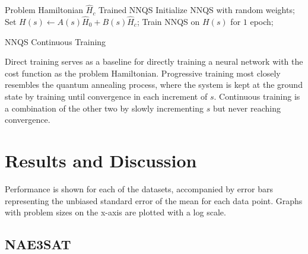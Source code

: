 \begin{algorithm}
    \begin{algorithmic}
    \Require Problem Hamiltonian $\hat{H}_c$
    \Ensure Trained NNQS
    \State Initialize NNQS with random weights;
    \State Set $H(s) \leftarrow A(s)\hat{H}_0 + B(s)\hat{H}_c$;
    \State Train NNQS on $H(s)$ for $1$ epoch;
    \EndFor
    \end{algorithmic}
    \caption{NNQS Continuous Training}
    \label{alg:continuous}
\end{algorithm}

Direct training serves as a baseline for directly training a neural network with the cost function as the problem Hamiltonian. Progressive training most closely resembles the quantum annealing process, where the system is kept at the ground state by training until convergence in each increment of $s$. Continuous training is a combination of the other two by slowly incrementing $s$ but never reaching convergence.

\section{Results and Discussion}
Performance is shown for each of the datasets, accompanied by error bars representing the unbiased standard error of the mean for each data point. Graphs with problem sizes on the x-axis are plotted with a log scale.

\subsection{NAE3SAT}

